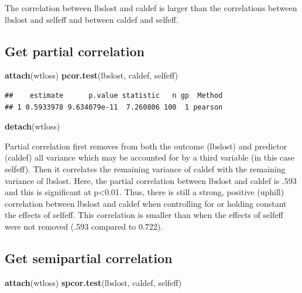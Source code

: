 \documentclass[]{article}
\newenvironment{Shaded}{\begin{snugshade}}{\end{snugshade}}
\newcommand{\KeywordTok}[1]{\textcolor[rgb]{0.13,0.29,0.53}{\textbf{#1}}}
\newcommand{\NormalTok}[1]{#1}
\begin{document}
The correlation between lbslost and caldef is larger than the
correlations between lbslost and selfeff and between caldef and selfeff.

\subsection{Get partial correlation}\label{get-partial-correlation}

\begin{Shaded}
\begin{Highlighting}[]
\KeywordTok{attach}\NormalTok{(wtloss)}
\KeywordTok{pcor.test}\NormalTok{(lbslost, caldef, selfeff)}
\end{Highlighting}
\end{Shaded}

\begin{verbatim}
##    estimate      p.value statistic   n gp  Method
## 1 0.5933978 9.634079e-11  7.260806 100  1 pearson
\end{verbatim}

\begin{Shaded}
\begin{Highlighting}[]
\KeywordTok{detach}\NormalTok{(wtloss)}
\end{Highlighting}
\end{Shaded}

Partial correlation first removes from both the outcome (lbslost) and
predictor (caldef) all variance which may be accounted for by a third
variable (in this case selfeff). Then it correlates the remaining
variance of caldef with the remaining variance of lbslost. Here, the
partial correlation between lbslost and caldef is .593 and this is
significant at p\textless{}0.01. Thus, there is still a strong, positive
(uphill) correlation between lbslost and caldef when controlling for or
holding constant the effects of selfeff. This correlation is smaller
than when the effects of selfeff were not removed (.593 compared to
0.722).

\subsection{Get semipartial
correlation}\label{get-semipartial-correlation}

\begin{Shaded}
\begin{Highlighting}[]
\KeywordTok{attach}\NormalTok{(wtloss)}
\KeywordTok{spcor.test}\NormalTok{(lbslost, caldef, selfeff)}
\end{Highlighting}
\end{Shaded}
\end{document}
